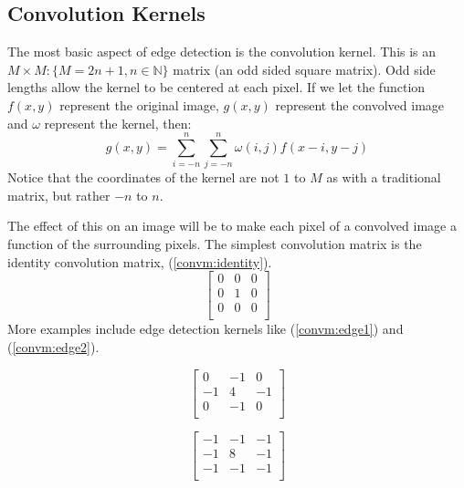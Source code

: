 \documentclass[12pt,english]{article}
\begin{document}
\subsection{Convolution Kernels}
The most basic aspect of edge detection is the convolution kernel.
This is an $M{\times}M: \{M=2n+1, n\in\mathbb{N}\}$ matrix
(an odd sided square matrix).
Odd side lengths allow the kernel to be centered at each pixel.  If we let the function $f(x,y)$ represent the original image, $g(x,y)$ represent the convolved image and $\omega$
represent the kernel, then:
\begin{equation}
	g(x,y)=\sum_{i=-n}^{n}\sum_{j=-n}^{n}\omega(i,j)f(x-i,y-j)
\end{equation}
Notice that the coordinates of the kernel are not $1$ to $M$
as with a traditional matrix, but rather $-n$ to $n$.

The effect of this on an image will be to make each pixel of a
convolved image a function of the surrounding pixels.
The simplest convolution matrix is the identity convolution matrix,
(\ref{convm:identity}).
\begin{equation}
	\label{convm:identity}
	\begin{bmatrix}
		0 & 0 & 0\\
		0 & 1 & 0\\
		0 & 0 & 0\\
	\end{bmatrix}
\end{equation}
More examples include edge detection kernels like
(\ref{convm:edge1}) and (\ref{convm:edge2}).
\begin{center}
\begin{minipage}{.4\linewidth}
\begin{equation} \label{convm:edge1}
	\begin{bmatrix}
		 0 & -1 &  0\\
		-1 &  4 & -1\\
		 0 & -1 &  0\\
	\end{bmatrix}
\end{equation}
\end{minipage}
\begin{minipage}{.4\linewidth}
\begin{equation} \label{convm:edge2}
	\begin{bmatrix}
		-1 & -1 & -1\\
		-1 &  8 & -1\\
		-1 & -1 & -1\\
	\end{bmatrix}
\end{equation}
\end{minipage}
\end{center}
\end{document}
